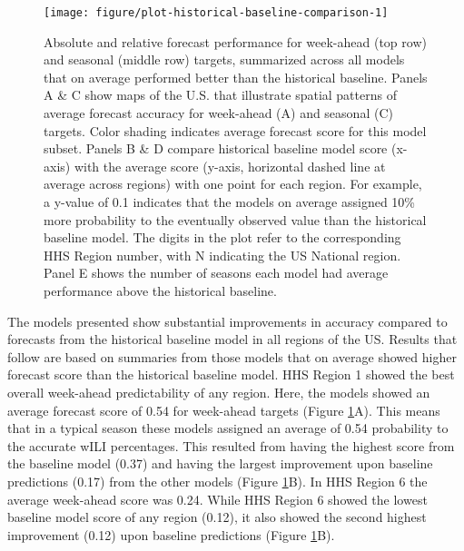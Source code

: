 \documentclass[9pt,twocolumn,twoside]{pnas-new}\usepackage[]{graphicx}\usepackage[]{color}
\newenvironment{knitrout}{}{} %
\begin{document}
\begin{knitrout}
\color{fgcolor}\begin{figure}
\texttt{[image: figure/plot-historical-baseline-comparison-1]} \caption[Absolute and relative forecast performance for week-ahead (top row) and seasonal (middle row) targets, summarized across all models that on average performed better than the historical baseline]{Absolute and relative forecast performance for week-ahead (top row) and seasonal (middle row) targets, summarized across all models that on average performed better than the historical baseline. Panels A \& C show maps of the U.S. that illustrate spatial patterns of average forecast accuracy for week-ahead (A) and seasonal (C) targets. Color shading indicates average forecast score for this model subset. Panels B \& D compare historical baseline model score (x-axis) with the average score (y-axis, horizontal dashed line at average across regions) with one point for each region. For example, a y-value of 0.1 indicates that the models on average assigned 10\% more probability to the eventually observed value than the historical baseline model. The digits in the plot refer to the corresponding HHS Region number, with N indicating the US National region. Panel E shows the number of seasons each model had average performance above the historical baseline.}\label{fig:plot-historical-baseline-comparison}
\end{figure}


\end{knitrout}


The models presented show substantial improvements in accuracy compared to forecasts from the historical baseline model in all regions of the US.
Results that follow are based on summaries from those models that on average showed higher forecast score than the historical baseline model.
HHS Region 1 showed the best overall week-ahead predictability of any region. Here, the models showed an average forecast score of 
0.54 
for week-ahead targets (Figure \ref{fig:plot-historical-baseline-comparison}A). 
This means that in a typical season these models assigned an average of 
0.54 
probability to the accurate wILI percentages.
This resulted from having the highest score from the baseline model 
(0.37) 
and having the largest improvement upon baseline predictions 
(0.17)
from the other models (Figure \ref{fig:plot-historical-baseline-comparison}B).  
In HHS Region 6 the average week-ahead score was 
0.24. 
While HHS Region 6 showed the lowest baseline model score of any region
(0.12), 
it also showed the second highest improvement
(0.12)
upon baseline predictions (Figure \ref{fig:plot-historical-baseline-comparison}B).
\end{document}
